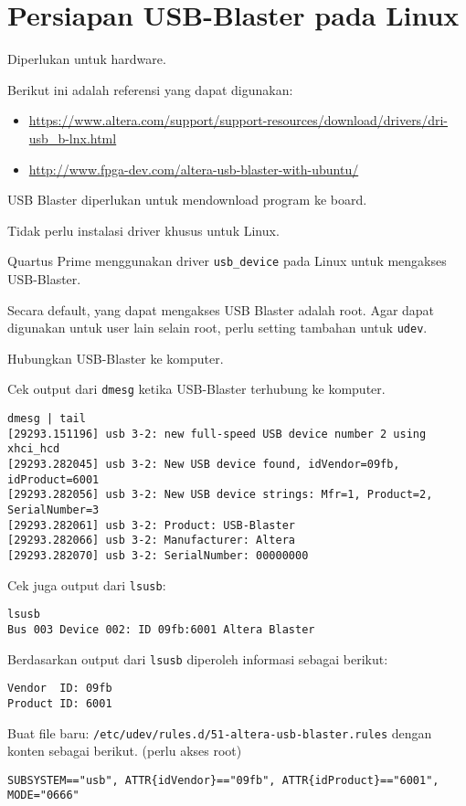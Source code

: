 \section{Persiapan USB-Blaster pada Linux}

Diperlukan untuk hardware.

Berikut ini adalah referensi yang dapat digunakan:
{\small
\begin{itemize}
\item \url{https://www.altera.com/support/support-resources/download/drivers/dri-usb_b-lnx.html}
\item \url{http://www.fpga-dev.com/altera-usb-blaster-with-ubuntu/}
\end{itemize}
}

USB Blaster diperlukan untuk mendownload program ke board.

Tidak perlu instalasi driver khusus untuk Linux.

Quartus Prime menggunakan driver \verb|usb_device|
pada Linux untuk mengakses USB-Blaster.

Secara default, yang dapat mengakses USB Blaster adalah root. Agar dapat digunakan
untuk user lain selain root, perlu setting tambahan untuk \verb|udev|.

Hubungkan USB-Blaster ke komputer.

Cek output dari \verb|dmesg| ketika USB-Blaster terhubung ke komputer.
{\small{}
\begin{verbatim}
dmesg | tail
[29293.151196] usb 3-2: new full-speed USB device number 2 using xhci_hcd
[29293.282045] usb 3-2: New USB device found, idVendor=09fb, idProduct=6001
[29293.282056] usb 3-2: New USB device strings: Mfr=1, Product=2, SerialNumber=3
[29293.282061] usb 3-2: Product: USB-Blaster
[29293.282066] usb 3-2: Manufacturer: Altera
[29293.282070] usb 3-2: SerialNumber: 00000000
\end{verbatim}
}

Cek juga output dari \verb|lsusb|:
{\small{}
\begin{verbatim}
lsusb
Bus 003 Device 002: ID 09fb:6001 Altera Blaster
\end{verbatim}
}

Berdasarkan output dari \verb|lsusb| diperoleh informasi
sebagai berikut:
{\small{}
\begin{verbatim}
Vendor  ID: 09fb
Product ID: 6001
\end{verbatim}
}

Buat file baru: {\tt\small /etc/udev/rules.d/51-altera-usb-blaster.rules}
dengan konten sebagai berikut. (perlu akses root)
{\small{}
\begin{verbatim}
SUBSYSTEM=="usb", ATTR{idVendor}=="09fb", ATTR{idProduct}=="6001", MODE="0666"
\end{verbatim}
}

